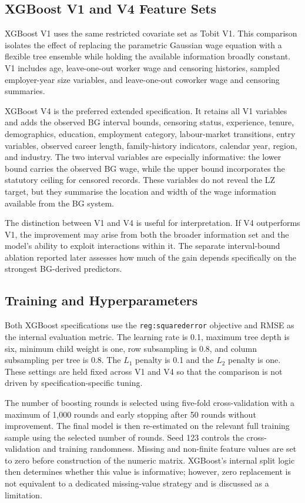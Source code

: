 \documentclass[12pt,a4paper,oneside,titlepage]{book}
\begin{document}
\subsection{XGBoost V1 and V4 Feature Sets}
XGBoost V1 uses the same restricted covariate set as Tobit V1. This comparison isolates the effect of replacing the parametric Gaussian wage equation with a flexible tree ensemble while holding the available information broadly constant. V1 includes age, leave-one-out worker wage and censoring histories, sampled employer-year size variables, and leave-one-out coworker wage and censoring summaries.

XGBoost V4 is the preferred extended specification. It retains all V1 variables and adds the observed BG interval bounds, censoring status, experience, tenure, demographics, education, employment category, labour-market transitions, entry variables, observed career length, family-history indicators, calendar year, region, and industry. The two interval variables are especially informative: the lower bound carries the observed BG wage, while the upper bound incorporates the statutory ceiling for censored records. These variables do not reveal the LZ target, but they summarise the location and width of the wage information available from the BG system.

The distinction between V1 and V4 is useful for interpretation. If V4 outperforms V1, the improvement may arise from both the broader information set and the model's ability to exploit interactions within it. The separate interval-bound ablation reported later assesses how much of the gain depends specifically on the strongest BG-derived predictors.

\subsection{Training and Hyperparameters}
Both XGBoost specifications use the \texttt{reg:squarederror} objective and RMSE as the internal evaluation metric. The learning rate is 0.1, maximum tree depth is six, minimum child weight is one, row subsampling is 0.8, and column subsampling per tree is 0.8. The $L_1$ penalty is 0.1 and the $L_2$ penalty is one. These settings are held fixed across V1 and V4 so that the comparison is not driven by specification-specific tuning.

The number of boosting rounds is selected using five-fold cross-validation with a maximum of 1,000 rounds and early stopping after 50 rounds without improvement. The final model is then re-estimated on the relevant full training sample using the selected number of rounds. Seed 123 controls the cross-validation and training randomness. Missing and non-finite feature values are set to zero before construction of the numeric matrix. XGBoost's internal split logic then determines whether this value is informative; however, zero replacement is not equivalent to a dedicated missing-value strategy and is discussed as a limitation.
\end{document}
